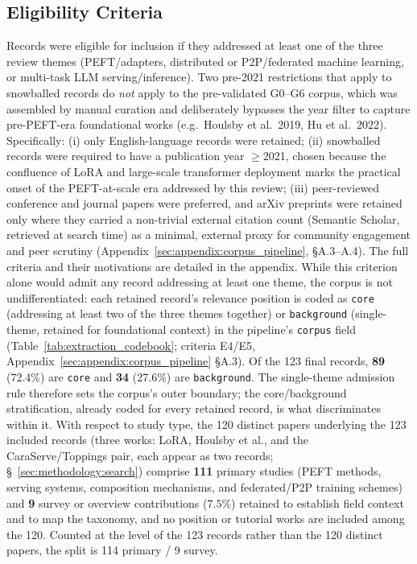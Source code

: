 \subsection{Eligibility Criteria}
\label{sec:methodology:eligibility}

Records were eligible for inclusion if they addressed at least one of the
three review themes (PEFT/adapters, distributed or P2P/federated machine
learning, or multi-task LLM serving/inference). Two pre-2021 restrictions
that apply to snowballed records do \emph{not} apply to the pre-validated
G0--G6 corpus, which was assembled by manual curation and deliberately
bypasses the year filter to capture pre-PEFT-era foundational works
(e.g.\ Houlsby et al.\ 2019, Hu et al.\ 2022). Specifically:
(i) only English-language records were retained;
(ii) snowballed records were required to have a publication year
$\geq$2021, chosen because the confluence of LoRA and large-scale transformer
deployment marks the practical onset of the PEFT-at-scale era addressed by
this review;
(iii) peer-reviewed conference and journal papers were preferred, and
arXiv preprints were retained only where they carried a non-trivial external
citation count (Semantic Scholar, retrieved at search time) as a minimal,
external proxy for community engagement and peer scrutiny
(Appendix~\ref{sec:appendix:corpus_pipeline}, \S A.3--A.4). The full criteria
and their motivations are detailed in the appendix. While this criterion alone
would admit any record addressing at least one theme, the corpus is not
undifferentiated: each retained record's relevance position is coded as
\texttt{core} (addressing at least two of the three themes together) or
\texttt{background} (single-theme, retained for foundational context) in the
pipeline's \texttt{corpus} field (Table~\ref{tab:extraction_codebook};
criteria E4/E5, Appendix~\ref{sec:appendix:corpus_pipeline} \S A.3). Of the
123 final records, \textbf{89} (72.4\%) are \texttt{core} and \textbf{34}
(27.6\%) are \texttt{background}. The single-theme admission rule therefore
sets the corpus's outer boundary; the core/background stratification,
already coded for every retained record, is what discriminates within it.
With respect to study type,
the 120 distinct papers underlying the 123 included records (three works:
LoRA, Houlsby et al., and the CaraServe/Toppings pair, each appear as two
records; \S~\ref{sec:methodology:search}) comprise \textbf{111} primary studies
(PEFT methods, serving systems, composition mechanisms, and federated/P2P
training schemes) and \textbf{9} survey or overview contributions ($7.5\%$)
retained to establish field context and to map the taxonomy, and no position or
tutorial works are included among the 120. Counted at the level of the 123
records rather than the 120 distinct papers, the split is 114 primary / 9
survey.

